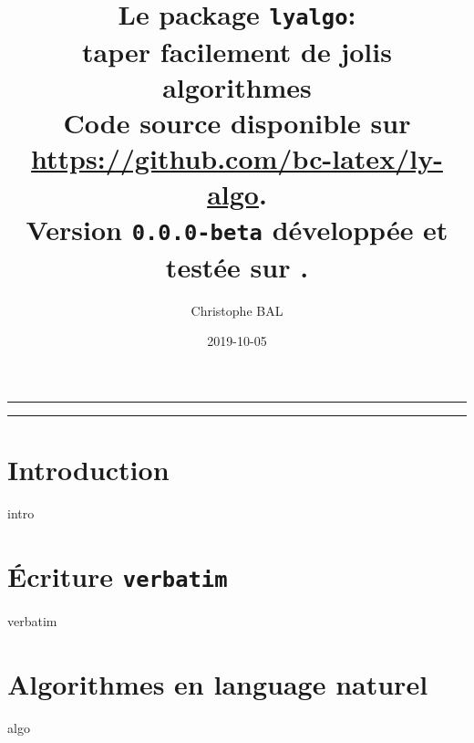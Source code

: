 \documentclass[12pt,a4paper]{article}
\begin{document}
\title{%
	Le package \texttt{lyalgo}:
	\\
	taper facilement de jolis algorithmes
	\\
	{
		\footnotesize Code source disponible
		sur \url{https://github.com/bc-latex/ly-algo}.%
	}
	\\
	{
		\footnotesize Version \texttt{0.0.0-beta}
		développée et testée sur \macosxname{}.%
	}
}

\author{Christophe BAL}
\date{2019-10-05}

\maketitle


\vspace{2em}

\hrule

\tableofcontents

\vspace{1.5em}

\hrule

\newpage





\section{Introduction}

{intro}







\section{Écriture \texttt{verbatim}}

{verbatim}




\section{Algorithmes en language naturel}

{algo}



%
%
\end{document}
